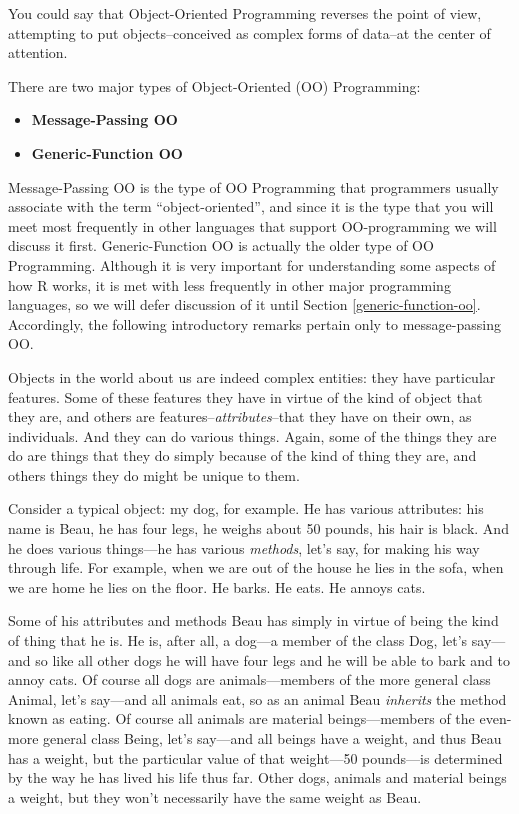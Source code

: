 \documentclass[]{book}
\providecommand{\tightlist}{%
  \setlength{\itemsep}{0pt}\setlength{\parskip}{0pt}}
\theoremstyle{definition}
\theoremstyle{definition}
\theoremstyle{definition}
\theoremstyle{remark}
\begin{document}
{You could say that Object-Oriented Programming
 reverses the point of view,
attempting to put objects--conceived as complex forms of data--at the
center of attention.

There are two major types of Object-Oriented (OO) Programming:

\begin{itemize}
\tightlist
\item
  \textbf{Message-Passing OO}
\item
  \textbf{Generic-Function OO}
\end{itemize}

Message-Passing OO is the type of OO
Programming that programmers usually associate with the term
``object-oriented'', and since it is the type that you will meet most
frequently in other languages that support OO-programming we will
discuss it first. Generic-Function OO is actually the older type of OO
Programming. Although it is very important for understanding some
aspects of how R works, it is met with less frequently in other major
programming languages, so we will defer discussion of it until Section
\ref{generic-function-oo}. Accordingly, the following introductory
remarks pertain only to message-passing OO.

Objects in the world about us are indeed complex entities: they have
particular features. Some of these features they have in virtue of the
kind of object that they are, and others are
features--\emph{attributes}--that they have on their own, as
individuals. And they can do various things. Again, some of the things
they are do are things that they do simply because of the kind of thing
they are, and others things they do might be unique to them.

Consider a typical object: my dog, for example. He has various
attributes: his name is Beau, he has four legs, he weighs about 50
pounds, his hair is black. And he does various things---he has various
\emph{methods}, let's say, for making his way through life. For example,
when we are out of the house he lies in the sofa, when we are home he
lies on the floor. He barks. He eats. He annoys cats. 

Some of his attributes and methods Beau has simply in virtue of being
the kind of thing that he is. He is, after all, a dog---a member of the
class Dog, let's say---and so like all other dogs he will have four legs
and he will be able to bark and to annoy cats. Of course all dogs are
animals---members of the more general class Animal, let's say---and all
animals eat, so as an animal Beau \emph{inherits} the
method known as eating. Of course all animals are material
beings---members of the even-more general class Being, let's say---and
all beings have a weight, and thus Beau has a weight, but the particular
value of that weight---50 pounds---is determined by the way he has lived
his life thus far. Other dogs, animals and material beings a weight, but
they won't necessarily have the same weight as Beau.

}
\end{document}
